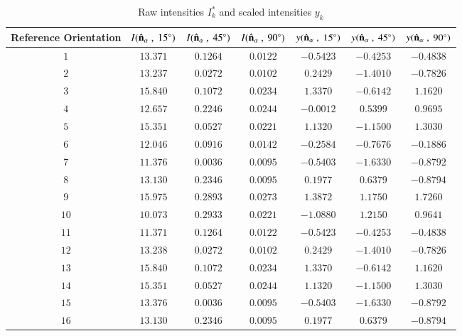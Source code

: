 \documentclass[final, 3p]{elsarticle}
\begin{document}
\newpage
\begin{table}[h]
  \begin{center}
    \caption{\label{tab:A2}
      Raw intensities $I_k^*$ and scaled intensities $y_k$}
    \begin{tabular}{|c|c|c|c|c|c|c|}
      \hline\hline
      Reference Orientation  & $I(\hat{\bf n}_\alpha\ ,\ 15^{\circ})$ &  $I(\hat{\bf n}_\alpha \ , \ 45^{\circ})$ &  $I(\hat{\bf n}_\alpha \ ,\ 90^{\circ})$ & $y(\hat{\bf n}_\alpha \ , \ 15^{\circ})$ & $y(\hat{\bf n}_\alpha \ , \ 45^{\circ})$ & $y(\hat{\bf n}_\alpha \ , \ 90^{\circ})$ \\
\hline
$1$  & $13.371$ & $0.1264$ & $0.0122$ & $-0.5423$ & $-0.4253$ & $-0.4838$ \\
$2$  & $13.237$ & $0.0272$ & $0.0102$ & $ 0.2429$ & $-1.4010$ & $-0.7826$ \\
$3$  & $15.840$ & $0.1072$ & $0.0234$ & $ 1.3370$ & $-0.6142$ & $ 1.1620$ \\
$4$  & $12.657$ & $0.2246$ & $0.0244$ & $-0.0012$ &	$ 0.5399$ & $ 0.9695$ \\
$5$  & $15.351$ & $0.0527$ & $0.0221$ & $ 1.1320$ & $-1.1500$ & $ 1.3030$ \\
$6$  & $12.046$ & $0.0916$ & $0.0142$ & $-0.2584$ &	$-0.7676$ &	$-0.1886$ \\
$7$  & $11.376$ & $0.0036$ & $0.0095$ & $-0.5403$ & $-1.6330$ & $-0.8792$ \\
$8$  & $13.130$ & $0.2346$ & $0.0095$ & $ 0.1977$ & $ 0.6379$ & $-0.8794$ \\
$9$  & $15.975$ & $0.2893$ & $0.0273$ & $ 1.3872$ & $ 1.1750$ & $ 1.7260$ \\
$10$ & $10.073$ & $0.2933$ & $0.0221$ & $-1.0880$ & $ 1.2150$ & $ 0.9641$ \\
$11$ & $11.371$ & $0.1264$ & $0.0122$ & $-0.5423$ & $-0.4253$ & $-0.4838$ \\
$12$ & $13.238$ & $0.0272$ & $0.0102$ & $ 0.2429$ &	$-1.4010$ & $-0.7826$ \\
$13$ & $15.840$ & $0.1072$ & $0.0234$ & $ 1.3370$ & $-0.6142$ & $ 1.1620$ \\
$14$ & $15.351$ & $0.0527$ & $0.0244$ & $ 1.1320$ & $-1.1500$ & $ 1.3030$ \\
$15$ & $13.376$ & $0.0036$ & $0.0095$ & $-0.5403$ & $-1.6330$ & $-0.8792$ \\
$16$ & $13.130$ & $0.2346$ & $0.0095$ & $ 0.1977$ & $ 0.6379$ & $-0.8794$ \\

\end{tabular}
\end{center}
\end{table}
\end{document}
